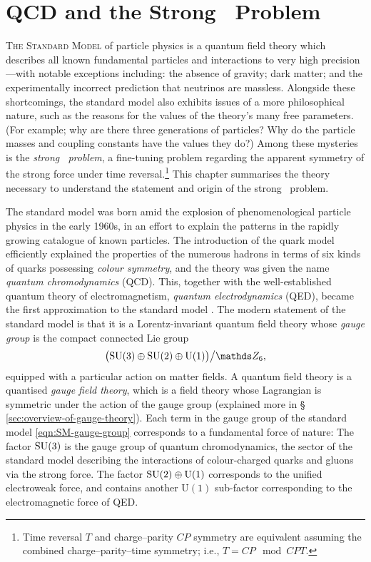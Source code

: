 \chapter{QCD and the Strong \CP\ Problem}

\textsc{The Standard Model} of particle physics is a quantum field theory which describes all known fundamental particles and interactions to very high precision---with notable exceptions including:
the absence of gravity;
dark matter;
and the experimentally incorrect prediction that neutrinos are massless.
Alongside these shortcomings, the standard model also exhibits issues of a more philosophical nature, such as the reasons for the values of the theory's many free parameters. (For example; why are there three generations of particles? Why do the particle masses and coupling constants have the values they do?)
Among these mysteries is the \emph{strong \CP\ problem}, a fine-tuning problem regarding the apparent symmetry of the strong force under time reversal.\footnote{Time reversal $T$ and charge--parity $CP$ symmetry are equivalent assuming the combined charge--parity--time symmetry; i.e., $T = CP \mod CPT$.}
This chapter summarises the theory necessary to understand the statement and origin of the strong \CP\ problem.

The standard model was born amid the explosion of phenomenological particle physics in the early 1960s, in an effort to explain the patterns in the rapidly growing catalogue of known particles.
The introduction of the quark model efficiently explained the properties of the numerous hadrons in terms of six kinds of quarks possessing \emph{colour symmetry}, and the theory was given the name \emph{quantum chromodynamics} (QCD). This, together with the well-established quantum theory of electromagnetism, \emph{quantum electrodynamics} (QED), became the first approximation to the standard model \cite{Weinberg_2004-history}.
The modern statement of the standard model is that it is a Lorentz-invariant {quantum field theory} whose \emph{gauge group} is the compact connected Lie group
\begin{align}
	\qty\big(\SU(3)\oplus\SU(2)\oplus\mathrm{U}(1))\big/\ZZ_6
	\label{eqn:SM-gauge-group}
,\end{align}
equipped with a particular action on matter fields.
A quantum field theory is a quantised \emph{gauge field theory}, which is a field theory whose Lagrangian is symmetric under the action of the gauge group (explained more in §\,\ref{sec:overview-of-gauge-theory}).
Each term in the gauge group of the standard model \eqref{eqn:SM-gauge-group} corresponds to a fundamental force of nature:
The factor $\mathrm{SU}(3)$ is the gauge group of quantum chromodynamics, the sector of the standard model describing the interactions of colour-charged quarks and gluons via the strong force.
The factor $\mathrm{SU}(2)\oplus\mathrm{U}(1)$ corresponds to the unified electroweak force, and contains another $\mathrm{U}(1)$ sub-factor corresponding to the electromagnetic force of QED.

